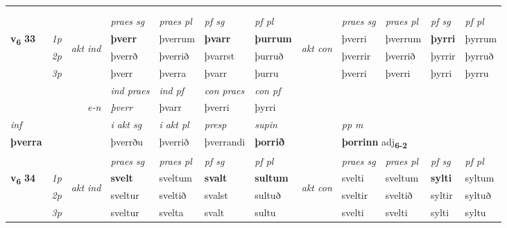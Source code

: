 \begin{longtable}[l]{X>{\footnotesize\itshape}llXXXXlXXXX}
\midrule
   & \\*
  & \\
   \midrule
 & &   & \textit{praes sg}  & \textit{praes pl}    & \textit{ pf sg} & \textit{pf pl} & & \textit{praes sg}  & \textit{praes pl}    & \textit{pf sg} & \textit{pf pl }  \\ \cmidrule{4-7} \cmidrule{9-12}
 \multirow{2}{*}{{{\textbf{v{\textsubscript{6}}} \Large{\textbf{33}}}}}  & 1p & \multirow{3}{*}{\begin{turn}{90}\textit{akt ind}\end{turn}} & \textbf{þverr} & þverrum & \textbf{þvarr} & \textbf{þurrum} & \multirow{3}{*}{\begin{turn}{90}\textit{akt con}\end{turn}} &þverri & þverrum & \textbf{þyrri} & þyrrum\\*
 & 2p &  &  þverrð  & þverrið & þvarrst & þurruð & & þverrir & þverrið & þyrrir & þyrruð \\*
 & 3p &  & þverr & þverra & þvarr & þurru & & þverri & þverri& þyrri & þyrru \\*
\cmidrule{4-7} \cmidrule{9-12}

   && &  \textit{ind praes} & \textit{ind pf} & \textit{con praes} & \textit{con pf} \\*
\multicolumn{3}{r}{\textit{e-n}} & þverr & þvarr & þverri & þyrri \\*

\cmidrule{4-7}
   {\textit{inf}} & &  & \textit{i akt sg} & \textit{i akt pl}   & \textit{presp} & \textit{supin}  && \textit{pp m} \\*
  {\textbf{þverra}} & && þverrðu  & þverrið   & þverrandi &  \textbf{þorrið}  && \multicolumn{2}{l}{\textbf{þorrinn} adj\textbf{\textsubscript{6-2}}} \\*

\midrule

 & &   & \textit{praes sg}  & \textit{praes pl}    & \textit{ pf sg} & \textit{pf pl} & & \textit{praes sg}  & \textit{praes pl}    & \textit{pf sg} & \textit{pf pl }  \\ \cmidrule{4-7} \cmidrule{9-12}
 \multirow{2}{*}{{{\textbf{v{\textsubscript{6}}} \Large{\textbf{34}}}}}  & 1p & \multirow{3}{*}{\begin{turn}{90}\textit{akt ind}\end{turn}} & \textbf{svelt} & sveltum & \textbf{svalt} & \textbf{sultum} & \multirow{3}{*}{\begin{turn}{90}\textit{akt con}\end{turn}} &svelti & sveltum & \textbf{sylti} & syltum\\*
 & 2p &  &  sveltur  & sveltið & svalst & sultuð & & sveltir & sveltið & syltir & syltuð \\*
 & 3p &  & sveltur & svelta & svalt & sultu & & svelti & svelti& sylti & syltu \\*
\cmidrule{4-7} \cmidrule{9-12}


\end{longtable}
